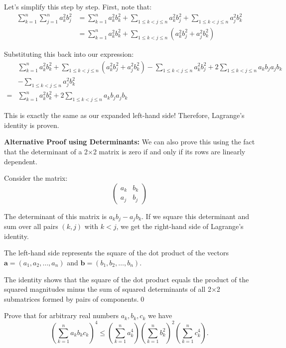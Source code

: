 Let's simplify this step by step. First, note that:
\begin{align*}
\sum_{k=1}^n \sum_{j=1}^n a_k^2 b_j^2 &= \sum_{k=1}^n a_k^2 b_k^2 + \sum_{1 \leq k < j \leq n} a_k^2 b_j^2 + \sum_{1 \leq k < j \leq n} a_j^2 b_k^2 \\
&= \sum_{k=1}^n a_k^2 b_k^2 + \sum_{1 \leq k < j \leq n} (a_k^2 b_j^2 + a_j^2 b_k^2)
\end{align*}

Substituting this back into our expression:
\begin{align*}
&\sum_{k=1}^n a_k^2 b_k^2 + \sum_{1 \leq k < j \leq n} (a_k^2 b_j^2 + a_j^2 b_k^2) - \sum_{1 \leq k < j \leq n} a_k^2 b_j^2 + 2 \sum_{1 \leq k < j \leq n} a_k b_j a_j b_k  \\
&- \sum_{1 \leq k < j \leq n} a_j^2 b_k^2 \\
=& \sum_{k=1}^n a_k^2 b_k^2 + 2 \sum_{1 \leq k < j \leq n} a_k b_j a_j b_k
\end{align*}

This is exactly the same as our expanded left-hand side! Therefore, Lagrange's identity is proven.

\textbf{Alternative Proof using Determinants:}
We can also prove this using the fact that the determinant of a 2×2 matrix is zero if and only if its rows are linearly dependent.

Consider the matrix:
\[
\begin{pmatrix}
a_k & b_k \\
a_j & b_j
\end{pmatrix}
\]

The determinant of this matrix is $a_k b_j - a_j b_k$. If we square this determinant and sum over all pairs $(k,j)$ with $k < j$, we get the right-hand side of Lagrange's identity.

The left-hand side represents the square of the dot product of the vectors $\mathbf{a} = (a_1, a_2, \ldots, a_n)$ and $\mathbf{b} = (b_1, b_2, \ldots, b_n)$.

The identity shows that the square of the dot product equals the product of the squared magnitudes minus the sum of squared determinants of all 2×2 submatrices formed by pairs of components.\qed


\begin{problembox}
Prove that for arbitrary real numbers \( a_k, b_k, c_k \) we have
\[
\left( \sum_{k=1}^n a_k b_k c_k \right)^4 \leq
\left( \sum_{k=1}^n a_k^4 \right)
\left( \sum_{k=1}^n b_k^2 \right)^2
\left( \sum_{k=1}^n c_k^4 \right).
\]
\end{problembox}

